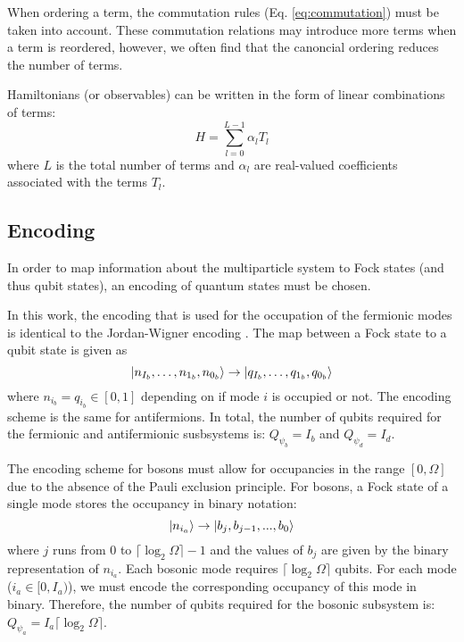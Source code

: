 When ordering a term, the commutation rules (Eq. \ref{eq:commutation}) must be taken into account.
These commutation relations may introduce more terms when a term is reordered, however, we often find that the canoncial ordering reduces the number of terms.


Hamiltonians (or observables) can be written in the form of linear combinations of terms:
\begin{equation}
    \label{eq:lclo}
    H = \sum_{l=0}^{L-1} \alpha_l T_l
\end{equation}
where $L$ is the total number of terms and $\alpha_l$ are real-valued coefficients associated with the terms $T_l$.


\subsection{Encoding}
\label{subsec:encoding}
In order to map information about the multiparticle system to Fock states (and thus qubit states), an encoding of quantum states must be chosen.

In this work, the encoding that is used for the occupation of the fermionic modes is identical to the Jordan-Wigner encoding \cite{jordan-wigner}.
The map between a Fock state to a qubit state is given as 
\begin{equation}
    \ket{n_{I_b}, \dots, n_{1_b}, n_{0_b}} \rightarrow \ket{q_{I_b}, \dots, q_{1_b}, q_{0_b}}
\end{equation}
where $n_{i_b} = q_{i_b} \in [0, 1]$ depending on if mode $i$ is occupied or not.
The encoding scheme is the same for antifermions.
In total, the number of qubits required for the fermionic and antifermionic susbsystems is: $Q_{\psi_b} = I_b$ and $Q_{\psi_d} = I_d$.

The encoding scheme for bosons must allow for occupancies in the range $[0, \Omega]$ due to the absence of the Pauli exclusion principle.
For bosons, a Fock state of a single mode stores the occupancy in binary notation: 
\begin{equation}
    \ket{n_{i_a}} \rightarrow \ket{b_j, b_{j-1}, ..., b_0}
\end{equation}
where $j$ runs from $0$ to $\lceil \log_2{\Omega} \rceil - 1$ and the values of $b_j$ are given by the binary representation of $n_{i_a}$.
Each bosonic mode requires $\lceil \log_2{\Omega} \rceil$ qubits.
For each mode ($i_a \in [0, I_a)$), we must encode the corresponding occupancy of this mode in binary. 
Therefore, the number of qubits required for the bosonic subsystem is: $Q_{\psi_a} = I_a \lceil \log_2{\Omega} \rceil$.

